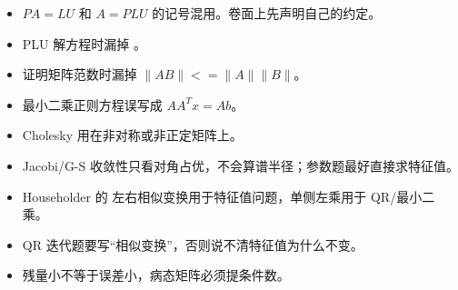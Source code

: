 \documentclass[11pt,a4paper]{ctexart}
\newcommand{\code}[1]{\begingroup\ttfamily\small #1\endgroup}
\begin{document}

\begin{itemize}

\item $PA=LU$ 和 $A=PLU$ 的记号混用。卷面上先声明自己的约定。

\item PLU 解方程时漏掉 \code{}。

\item 证明矩阵范数时漏掉 $\|AB\|<=\|A\|\|B\|$。

\item 最小二乘正则方程误写成 $AA^Tx=Ab$。

\item Cholesky 用在非对称或非正定矩阵上。

\item Jacobi/G-S 收敛性只看对角占优，不会算谱半径；参数题最好直接求特征值。

\item Householder 的 \code{} 左右相似变换用于特征值问题，单侧左乘用于 QR/最小二乘。

\item QR 迭代题要写“相似变换”，否则说不清特征值为什么不变。

\item 残量小不等于误差小，病态矩阵必须提条件数。

\end{itemize}
\end{document}
